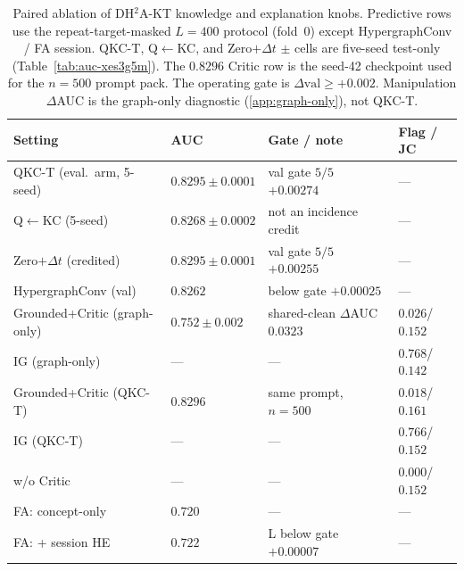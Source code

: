 \begin{table}[t]
\caption{Paired ablation of DH$^2$A-KT knowledge and explanation knobs.
Predictive rows use the repeat-target-masked $L{=}400$ protocol
(fold~0) except HypergraphConv / FA session.
QKC-T, Q$\leftarrow$KC, and Zero$+\Delta t$ $\pm$ cells are five-seed
test-only (Table~\ref{tab:auc-xes3g5m}).
The $0.8296$ Critic row is the seed-42 checkpoint used for the
$n{=}500$ prompt pack.
The operating gate is $\Delta\mathrm{val}\ge{+}0.002$.
Manipulation $\Delta$AUC is the graph-only diagnostic
(\ref{app:graph-only}), not QKC-T.}
\label{tab:paired-ablation}
\centering
\scriptsize
\setlength{\tabcolsep}{3.5pt}
\begin{tabularx}{\linewidth}{@{}
  >{\raggedright\arraybackslash}p{2.85cm}
  >{\centering\arraybackslash}p{2.05cm}
  >{\raggedright\arraybackslash}X
  >{\centering\arraybackslash}p{1.55cm}
  @{}}
\toprule
Setting & AUC & Gate / note & Flag / JC \\
\midrule
QKC-T (eval.\ arm, 5-seed)
  & $0.8295{\pm}0.0001$ & val gate $5/5$ $+0.00274$ & --- \\
Q$\leftarrow$KC (5-seed)
  & $0.8268{\pm}0.0002$ & not an incidence credit & --- \\
Zero$+\Delta t$ (credited)
  & $0.8295{\pm}0.0001$ & val gate $5/5$ $+0.00255$ & --- \\
HypergraphConv (val)
  & $0.8262$ & below gate $+0.00025$ & --- \\
Grounded+Critic (graph-only)
  & $0.752{\pm}0.002$ & shared-clean $\Delta$AUC $0.0323$ & $0.026$/$0.152$ \\
IG (graph-only)
  & --- & --- & $0.768$/$0.142$ \\
Grounded+Critic (QKC-T)
  & $0.8296$ & same prompt, $n{=}500$ & $0.018$/$0.161$ \\
IG (QKC-T)
  & --- & --- & $0.766$/$0.152$ \\
w/o Critic
  & --- & --- & $0.000$/$0.152$ \\
FA: concept-only
  & $0.720$ & --- & --- \\
FA: + session HE
  & $0.722$ & L below gate $+0.00007$ & --- \\
\bottomrule
\end{tabularx}
\end{table}
